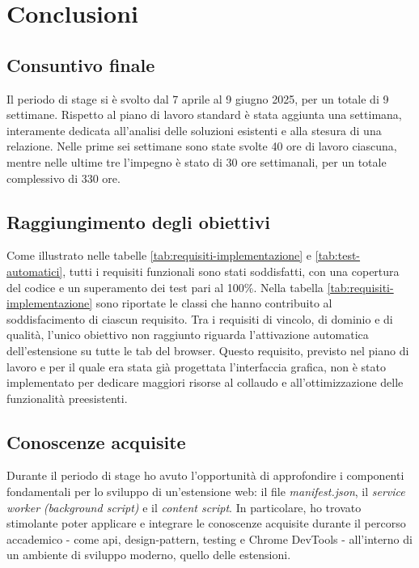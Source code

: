 \chapter{Conclusioni}
\label{cap:conclusioni}

\section{Consuntivo finale}

\par Il periodo di stage si è svolto dal 7 aprile al 9 giugno 2025, per un totale di 9 settimane. Rispetto al piano di lavoro standard è stata aggiunta una settimana, interamente dedicata all’analisi delle soluzioni esistenti e alla stesura di una relazione. Nelle prime sei settimane sono state svolte 40 ore di lavoro ciascuna, mentre nelle ultime tre l’impegno è stato di 30 ore settimanali, per un totale complessivo di 330 ore.

\section{Raggiungimento degli obiettivi}

\par Come illustrato nelle tabelle \ref{tab:requisiti-implementazione} e \ref{tab:test-automatici}, tutti i \gls{requisiti} funzionali sono stati soddisfatti, con una copertura del codice e un superamento dei test pari al 100\%. Nella tabella \ref{tab:requisiti-implementazione} sono riportate le classi che hanno contribuito al soddisfacimento di ciascun requisito. Tra i requisiti di vincolo, di dominio e di qualità, l’unico obiettivo non raggiunto riguarda l’attivazione automatica dell’estensione su tutte le tab del browser. Questo requisito, previsto nel piano di lavoro e per il quale era stata già progettata l’interfaccia grafica, non è stato implementato per dedicare maggiori risorse al collaudo e all’ottimizzazione delle funzionalità preesistenti.

\section{Conoscenze acquisite}

\par Durante il periodo di stage ho avuto l’opportunità di approfondire i componenti fondamentali per lo sviluppo di un’estensione web: il file \textit{manifest.json}, il \textit{service worker} \textit{(background script)} e il \textit{content script}. In particolare, ho trovato stimolante poter applicare e integrare le conoscenze acquisite durante il percorso accademico - come \gls{api}, \gls{design-pattern}, testing e Chrome DevTools - all’interno di un ambiente di sviluppo moderno, quello delle estensioni.

